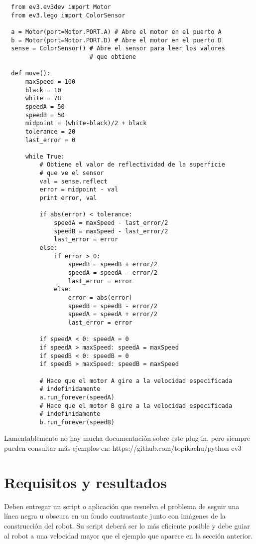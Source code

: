 \begin{verbatim}
  from ev3.ev3dev import Motor
  from ev3.lego import ColorSensor

  a = Motor(port=Motor.PORT.A) # Abre el motor en el puerto A
  b = Motor(port=Motor.PORT.D) # Abre el motor en el puerto D
  sense = ColorSensor() # Abre el sensor para leer los valores
                        # que obtiene

  def move():
      maxSpeed = 100
      black = 10
      white = 78
      speedA = 50
      speedB = 50
      midpoint = (white-black)/2 + black
      tolerance = 20
      last_error = 0

      while True:
          # Obtiene el valor de reflectividad de la superficie
          # que ve el sensor
          val = sense.reflect 
          error = midpoint - val
          print error, val

          if abs(error) < tolerance:
              speedA = maxSpeed - last_error/2
              speedB = maxSpeed - last_error/2
              last_error = error
          else:
              if error > 0:
                  speedB = speedB + error/2
                  speedA = speedA - error/2
                  last_error = error
              else:
                  error = abs(error)
                  speedB = speedB - error/2
                  speedA = speedA + error/2
                  last_error = error

          if speedA < 0: speedA = 0
          if speedA > maxSpeed: speedA = maxSpeed
          if speedB < 0: speedB = 0
          if speedB > maxSpeed: speedB = maxSpeed

          # Hace que el motor A gire a la velocidad especificada
          # indefinidamente
          a.run_forever(speedA) 
          # Hace que el motor B gire a la velocidad especificada
          # indefinidamente
          b.run_forever(speedB) 
\end{verbatim}

Lamentablemente no hay mucha documentación sobre este plug-in, pero siempre pueden consultar más ejemplos en: https://github.com/topikachu/python-ev3

\section{Requisitos y resultados}

Deben entregar un script o aplicación que resuelva el problema de seguir una línea negra u obscura en un fondo contrastante junto con imágenes de la construcción del robot. Su script deberá ser lo más eficiente posible y debe guiar al robot a una velocidad mayor que el ejemplo que aparece en la sección anterior.


